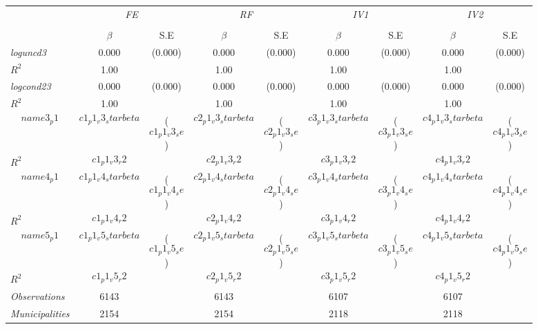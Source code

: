 
\begin{tabular}{lcccccccc}


\hline
\hline

\multicolumn{1}{l}{} & \multicolumn{2}{c}{\textit{FE}} & \multicolumn{2}{c}{\textit{RF}} & \multicolumn{2}{c}{\textit{IV1}} & \multicolumn{2}{c}{\textit{IV2}}  \\ 
\cmidrule(l{1mm}r{1mm}){2-3} \cmidrule(l{1mm}r{1mm}){4-5} \cmidrule(l{1mm}r{1mm}){6-7}  \cmidrule(l{1mm}r{1mm}){8-9}  \\
& $\beta$ & S.E & $\beta$ & S.E & $\beta$ & S.E & $\beta$ & S.E \\
\hline


\textit{loguncd3}    &  0.000    & (0.000)      &   0.000        &  (0.000)      &     0.000  &    (0.000) &     0.000  &    (0.000)   \\
$R^{2}$			         &  1.00   & 	   &     1.00   	&		 &     1.00   & &     1.00   &  \\
					
\textit{logcond23}    &  0.000    & (0.000)      &   0.000        &  (0.000)      &     0.000  &    (0.000)  &     0.000  &    (0.000) \\
$R^{2}$			         &  1.00   & 	   &     1.00   	&		 &     1.00   & &     1.00   &  \\
					
\textit{$$name3_p1$$}    &  $$c1_p1_v3_starbeta$$    & ($$c1_p1_v3_se$$)      &   $$c2_p1_v3_starbeta$$        &  ($$c2_p1_v3_se$$)      &     $$c3_p1_v3_starbeta$$  &    ($$c3_p1_v3_se$$)  &     $$c4_p1_v3_starbeta$$  &    ($$c4_p1_v3_se$$) \\
$R^{2}$			         &  $$c1_p1_v3_r2$$   & 	   &     $$c2_p1_v3_r2$$   	&		 &     $$c3_p1_v3_r2$$   & &     $$c4_p1_v3_r2$$   &  \\
					
\textit{$$name4_p1$$}    &  $$c1_p1_v4_starbeta$$    & ($$c1_p1_v4_se$$)      &   $$c2_p1_v4_starbeta$$        &  ($$c2_p1_v4_se$$)      &     $$c3_p1_v4_starbeta$$  &    ($$c3_p1_v4_se$$)  &     $$c4_p1_v4_starbeta$$  &    ($$c4_p1_v4_se$$) \\
$R^{2}$			         &  $$c1_p1_v4_r2$$   & 	   &     $$c2_p1_v4_r2$$   	&		 &     $$c3_p1_v4_r2$$   & &     $$c4_p1_v4_r2$$   &  \\
					
\textit{$$name5_p1$$}    &  $$c1_p1_v5_starbeta$$    & ($$c1_p1_v5_se$$)      &   $$c2_p1_v5_starbeta$$        &  ($$c2_p1_v5_se$$)      &     $$c3_p1_v5_starbeta$$  &    ($$c3_p1_v5_se$$) &     $$c4_p1_v5_starbeta$$  &    ($$c4_p1_v5_se$$)  \\
$R^{2}$			         &  $$c1_p1_v5_r2$$   & 	   &     $$c2_p1_v5_r2$$   	&		 &     $$c3_p1_v5_r2$$   &   &     $$c4_p1_v5_r2$$   &  \\


\hline		

\textit{Observations}                 &   6143    &  & 6143    &  &  6107   &  & 6107   &		\\
\textit{Municipalities}               &   2154   &  & 2154   &  &  2118  &  & 2118  &		\\


\end{tabular}%
